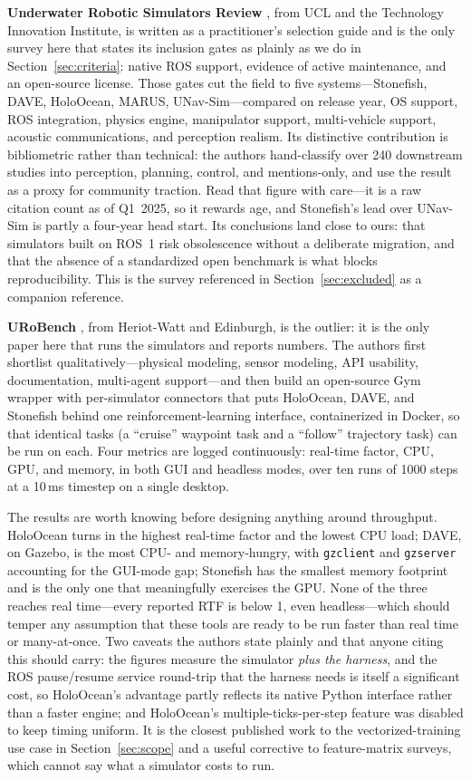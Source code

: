 \documentclass[11pt]{article}
\begin{document}
\textbf{Underwater Robotic Simulators Review} \autocite{aldhaheri2025ursreview}, from UCL and the Technology Innovation Institute, is written as a practitioner's selection guide and is the only survey here that states its inclusion gates as plainly as we do in Section~\ref{sec:criteria}: native ROS support, evidence of active maintenance, and an open-source license. Those gates cut the field to five systems---Stonefish, DAVE, HoloOcean, MARUS, UNav-Sim---compared on release year, OS support, ROS integration, physics engine, manipulator support, multi-vehicle support, acoustic communications, and perception realism. Its distinctive contribution is bibliometric rather than technical: the authors hand-classify over 240 downstream studies into perception, planning, control, and mentions-only, and use the result as a proxy for community traction. Read that figure with care---it is a raw citation count as of Q1~2025, so it rewards age, and Stonefish's lead over UNav-Sim is partly a four-year head start. Its conclusions land close to ours: that simulators built on ROS~1 risk obsolescence without a deliberate migration, and that the absence of a standardized open benchmark is what blocks reproducibility. This is the survey referenced in Section~\ref{sec:excluded} as a companion reference.

\textbf{URoBench} \autocite{huang2024urobench}, from Heriot-Watt and Edinburgh, is the outlier: it is the only paper here that runs the simulators and reports numbers. The authors first shortlist qualitatively---physical modeling, sensor modeling, API usability, documentation, multi-agent support---and then build an open-source Gym wrapper with per-simulator connectors that puts HoloOcean, DAVE, and Stonefish behind one reinforcement-learning interface, containerized in Docker, so that identical tasks (a ``cruise'' waypoint task and a ``follow'' trajectory task) can be run on each. Four metrics are logged continuously: real-time factor, CPU, GPU, and memory, in both GUI and headless modes, over ten runs of 1000 steps at a 10\,ms timestep on a single desktop.

The results are worth knowing before designing anything around throughput. HoloOcean turns in the highest real-time factor and the lowest CPU load; DAVE, on Gazebo, is the most CPU- and memory-hungry, with \texttt{gzclient} and \texttt{gzserver} accounting for the GUI-mode gap; Stonefish has the smallest memory footprint and is the only one that meaningfully exercises the GPU. None of the three reaches real time---every reported RTF is below 1, even headless---which should temper any assumption that these tools are ready to be run faster than real time or many-at-once. Two caveats the authors state plainly and that anyone citing this should carry: the figures measure the simulator \emph{plus the harness}, and the ROS pause/resume service round-trip that the harness needs is itself a significant cost, so HoloOcean's advantage partly reflects its native Python interface rather than a faster engine; and HoloOcean's multiple-ticks-per-step feature was disabled to keep timing uniform. It is the closest published work to the vectorized-training use case in Section~\ref{sec:scope} and a useful corrective to feature-matrix surveys, which cannot say what a simulator costs to run.
\end{document}
